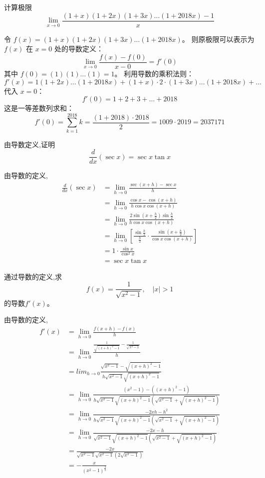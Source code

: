 \begin{questions}
    \question 计算极限
\[
\lim_{x \to 0} \frac{(1 + x)(1 + 2x)(1 + 3x) \dots (1 + 2018x) - 1}{x}
\]

\begin{solution}
令 $f(x) = (1 + x)(1 + 2x)(1 + 3x) \dots (1 + 2018x)$。
则原极限可以表示为 $f(x)$ 在 $x = 0$ 处的导数定义：
\[
\lim_{x \to 0} \frac{f(x) - f(0)}{x - 0} = f'(0)
\]
其中 $f(0) = (1)(1)\dots(1) = 1$。
利用导数的乘积法则：
\[
f'(x) = 1(1 + 2x)\dots(1 + 2018x) + (1 + x) \cdot 2 \cdot (1 + 3x)\dots(1 + 2018x) + \dots
\]
代入 $x = 0$：
\[
f'(0) = 1 + 2 + 3 + \dots + 2018
\]
这是一等差数列求和：
\[
f'(0) = \sum_{k=1}^{2018} k = \frac{(1 + 2018) \cdot 2018}{2} = 1009 \cdot 2019 = 2037171
\]
\end{solution}

    \question 由导数定义,证明 
    \[
    \frac{d}{dx}(\sec x) = \sec x \tan x
    \]
    \begin{solution}
        由导数的定义,
        \begin{align*}
        \frac{d}{dx}(\sec x) 
        &= \lim_{h \to 0} \frac{\sec(x+h) - \sec x}{h}\\
        &= \lim_{h \to 0} \frac{\cos x - \cos(x+h)}{h \cos x \cos(x+h)}\\
        &= \lim_{h \to 0} \frac{2 \sin\left(x+\frac{h}{2}\right) \sin\frac{h}{2}}{h \cos x \cos(x+h)}\\
        &= \lim_{h \to 0} \left[ \frac{\sin\frac{h}{2}}{\frac{h}{2}} \cdot \frac{\sin\left(x+\frac{h}{2}\right)}{\cos x \cos(x+h)} \right] \\
        &= 1 \cdot \frac{\sin x}{\cos^2 x} \\
        &= \sec x \tan x
        \end{align*}
    \end{solution}

    \question 通过导数的定义,求 
    \[
    f(x) = \frac{1}{\sqrt{x^2-1}}, \quad |x|>1
    \]
    的导数$f'(x)$。
    \begin{solution}
        由导数的定义,
        \begin{align*}
        f'(x) &= \lim_{h \to 0} \frac{f(x+h) - f(x)}{h} \\
        &= \lim_{h \to 0} \frac{\frac{1}{\sqrt{(x+h)^2-1}} - \frac{1}{\sqrt{x^2-1}}}{h} \\
        &= lim_{h \to 0} \frac{\sqrt{x^2-1} - \sqrt{(x+h)^2-1}}{h \sqrt{x^2-1} \sqrt{(x+h)^2-1}} \\
        &= \lim_{h \to 0} \frac{(x^2-1) - ((x+h)^2-1)}{h \sqrt{x^2-1} \sqrt{(x+h)^2-1} (\sqrt{x^2-1} + \sqrt{(x+h)^2-1})} \\
        &= \lim_{h \to 0} \frac{-2xh - h^2}{h \sqrt{x^2-1} \sqrt{(x+h)^2-1} (\sqrt{x^2-1} + \sqrt{(x+h)^2-1})} \\
        &= \lim_{h \to 0} \frac{-2x - h}{\sqrt{x^2-1} \sqrt{(x+h)^2-1} (\sqrt{x^2-1} + \sqrt{(x+h)^2-1})} \\
        &= \frac{-2x}{\sqrt{x^2-1} \sqrt{x^2-1} (2\sqrt{x^2-1})} \\
        &= -\frac{x}{(x^2-1)^{\frac{3}{2}}}
        \end{align*}
    \end{solution}


\end{questions}
